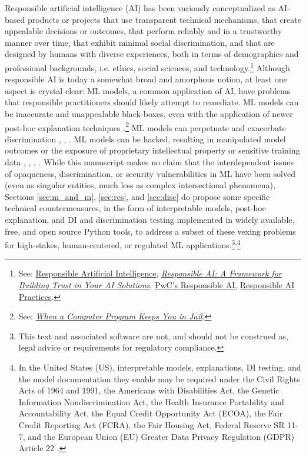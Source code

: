\documentclass[information,article,submit,moreauthors,pdftex]{definitions/mdpi}
\begin{document}
Responsible artificial intelligence (AI) has been variously conceptualized as AI-based products or projects that use transparent technical mechanisms, that create appealable decisions or outcomes, that perform reliably and in a trustworthy manner over time, that exhibit minimal social discrimination, and that are designed by humans with diverse experiences, both in terms of demographics and professional backgrounds, i.e. ethics, social sciences, and technology.\footnote{See: \href{https://ec.europa.eu/jrc/communities/sites/jrccties/files/03_dignum_v.pdf}{Responsible Artificial Intelligence}, \href{https://www.accenture.com/_acnmedia/pdf-92/accenture-afs-responsible-ai.pdf}{\textit{Responsible AI: A Framework for Building Trust in Your AI Solutions}}, \href{https://www.pwc.com/us/en/services/consulting/analytics/artificial-intelligence/what-is-responsible-ai.html}{PwC's Responsible AI}, \href{https://ai.google/responsibilities/responsible-ai-practices/}{Responsible AI Practices}.} Although responsible AI is today a somewhat broad and amorphous notion, at least one aspect is crystal clear: ML models, a common application of AI, have problems that responsible practitioners should likely attempt to remediate. ML models can be inaccurate and unappealable black-boxes, even with the application of newer post-hoc explanation techniques \cite{please_stop}.\footnote{See: \href{https://www.nytimes.com/2017/06/13/opinion/how-computers-are-harming-criminal-justice.html}{\textit{When a Computer Program Keeps You in Jail}}.} ML models can perpetuate and exacerbate discrimination \cite{feldman2015certifying}, \cite{dwork2012fairness}, \cite{gender_shades}.  ML models can be hacked, resulting in manipulated model outcomes or the exposure of proprietary intellectual property or sensitive training data \cite{security_of_ml}, \cite{model_stealing}, \cite{membership_inference}, \cite{shokri2019privacy}. While this manuscript makes no claim that the interdependent issues of opaqueness, discrimination, or security vulnerabilities in ML have been solved (even as singular entities, much less as complex intersectional phenomena), Sections \ref{sec:m_and_m}, \ref{sec:res}, and \ref{sec:disc} do propose some specific technical countermeasures, in the form of interpretable models, post-hoc explanation, and DI and discrimination testing implemented in widely available, free, and open source Python tools, to address a subset of these vexing problems for high-stakes, human-centered, or regulated ML applications.\footnote{This text and associated software are not, and should not be construed as, legal advice or requirements for regulatory compliance.}\textsuperscript{,}\footnote{In the United States (US), interpretable models, explanations, DI testing, and the model documentation they enable may be required under the Civil Rights Acts of 1964 and 1991, the Americans with Disabilities Act, the Genetic Information Nondiscrimination Act, the Health Insurance Portability and Accountability Act, the Equal Credit Opportunity Act (ECOA), the Fair Credit Reporting Act (FCRA), the Fair Housing Act, Federal Reserve SR 11-7, and the European Union (EU) Greater Data Privacy Regulation (GDPR) Article 22 \cite{ff_interpretability}.}
\end{document}
